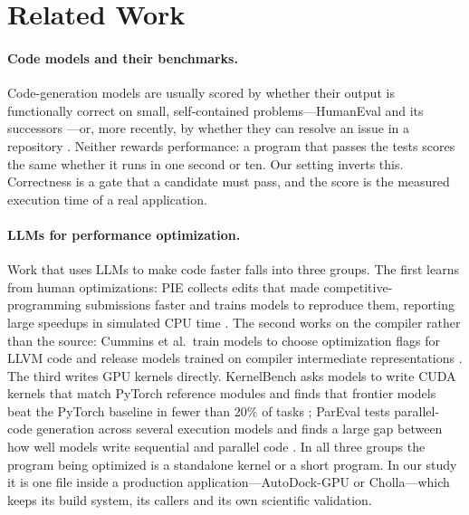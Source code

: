 \section{Related Work}
\label{sec:relatedwork}

\paragraph{Code models and their benchmarks.}
Code-generation models are usually scored by whether their output is functionally correct on small,
self-contained problems---HumanEval and its successors \cite{chen2021codex}---or, more recently, by
whether they can resolve an issue in a repository \cite{jimenez2024swebench}. Neither rewards
performance: a program that passes the tests scores the same whether it runs in one second or ten.
Our setting inverts this. Correctness is a gate that a candidate must pass, and the score is the
measured execution time of a real application.

\paragraph{LLMs for performance optimization.}
Work that uses LLMs to make code faster falls into three groups. The first learns from human
optimizations: PIE collects edits that made competitive-programming submissions faster and trains
models to reproduce them, reporting large speedups in simulated CPU time \cite{shypula2024pie}. The
second works on the compiler rather than the source: Cummins et al.\ train models to choose
optimization flags for LLVM code \cite{cummins2023llmopt} and release models trained on compiler
intermediate representations \cite{cummins2024llmcompiler}. The third writes GPU kernels directly.
KernelBench asks models to write CUDA kernels that match PyTorch reference modules and finds that
frontier models beat the PyTorch baseline in fewer than $20\%$ of tasks \cite{ouyang2025kernelbench};
ParEval tests parallel-code generation across several execution models and finds a large gap between
how well models write sequential and parallel code \cite{nichols2024parallel}. In all three groups the
program being optimized is a standalone kernel or a short program. In our study it is one file inside
a production application---AutoDock-GPU or Cholla---which keeps its build system, its callers and its
own scientific validation.

